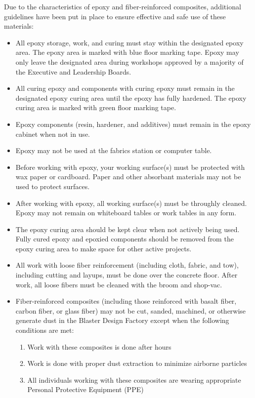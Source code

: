 \documentclass[12pt,letterpaper]{article}
\begin{document}
Due to the characteristics of epoxy and fiber-reinforced composites, additional guidelines have been put in place to ensure effective and safe use of these materials:
\begin{itemize}
    \item All epoxy storage, work, and curing must stay within the designated epoxy area. The epoxy area is marked with blue floor marking tape. Epoxy may only leave the designated area during workshops approved by a majority of the Executive and Leadership Boards.
    \item All curing epoxy and components with curing epoxy must remain in the designated epoxy curing area until the epoxy has fully hardened. The epoxy curing area is marked with green floor marking tape.
    \item Epoxy components (resin, hardener, and additives) must remain in the epoxy cabinet when not in use.
    \item Epoxy may not be used at the fabrics station or computer table.
    \item Before working with epoxy, your working surface(s) must be protected with wax paper or cardboard. Paper and other absorbant materials may not be used to protect surfaces.
    \item After working with epoxy, all working surface(s) must be throughly cleaned. Epoxy may not remain on whiteboard tables or work tables in any form.
    \item The epoxy curing area should be kept clear when not actively being used. Fully cured epoxy and epoxied components should be removed from the epoxy curing area to make space for other active projects. 
    \item All work with loose fiber reinforcement (including cloth, fabric, and tow), including cutting and layups, must be done over the concrete floor. After work, all loose fibers must be cleaned with the broom and shop-vac. 
    \item Fiber-reinforced composites (including those reinforced with basalt fiber, carbon fiber, or glass fiber) may not be cut, sanded, machined, or otherwise generate dust in the Blaster Design Factory except when the following conditions are met:
    \begin{enumerate}
        \item Work with these composites is done after hours
        \item Work is done with proper dust extraction to minimize airborne particles
        \item All individuals working with these composites are wearing appropriate Personal Protective Equipment (PPE)

\end{enumerate}
\end{itemize}
\end{document}
